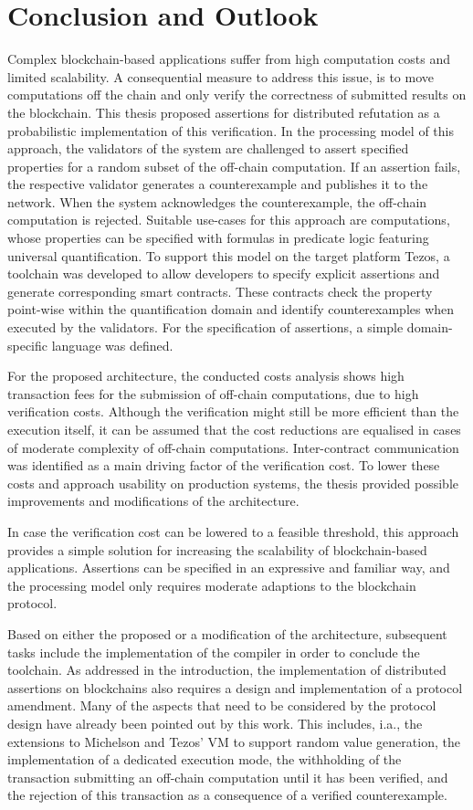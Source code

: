 \chapter{Conclusion and Outlook}\label{chap:conclusion}
Complex blockchain-based applications suffer from high computation costs and limited scalability. A consequential measure to address this issue, is to move computations off the chain and only verify the correctness of submitted results on the blockchain. This thesis  proposed assertions for distributed refutation as a probabilistic implementation of this verification. In the processing model of this approach, the validators of the system are challenged to assert specified properties for a random subset of the off-chain computation. If an assertion fails, the respective validator generates a counterexample and publishes it to the network. When the system acknowledges the counterexample, the off-chain computation is rejected. Suitable use-cases for this approach are computations, whose properties can be specified with formulas in predicate logic featuring universal quantification. To support this model on the target platform Tezos, a toolchain was developed to allow developers to specify explicit assertions and generate corresponding smart contracts. These contracts check the property point-wise within the quantification domain and identify counterexamples when executed by the validators. For the specification of assertions, a simple domain-specific language was defined.

For the proposed architecture, the conducted costs analysis shows high transaction fees for the submission of off-chain computations,  due to high verification costs. Although the verification might still be more efficient than the execution itself, it can be assumed that the cost reductions are equalised in cases of moderate complexity of off-chain computations. Inter-contract communication was identified as a main driving factor of the verification cost. To lower these costs and approach usability on production systems, the thesis provided possible improvements and modifications of the architecture.

In case the verification cost can be lowered to a feasible threshold, this approach provides a simple solution for increasing the scalability of blockchain-based applications. Assertions can be specified in an expressive and familiar way, and the processing model only requires moderate adaptions to the blockchain protocol.

Based on either the proposed or a modification of the architecture, subsequent tasks include the implementation of the compiler in order to conclude the toolchain. As addressed in the introduction, the implementation of distributed assertions on blockchains also requires a design and implementation of a protocol amendment. Many of the aspects that need to be considered by the protocol design have already been pointed out by this work. This includes, i.a., the extensions to Michelson and Tezos' VM to support random value generation, the implementation of a dedicated execution mode, the withholding of the transaction submitting an off-chain computation until it has been verified, and the rejection of this transaction as a consequence of a verified counterexample. 

